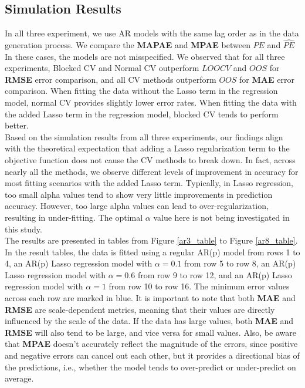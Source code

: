 \documentclass[12pt, oneside]{amsart}
\theoremstyle{definition}
\theoremstyle{remark}
\numberwithin{equation}{section}
\begin{document}
\subsection{Simulation Results}
In all three experiment, we use AR models with the same lag order as in the data generation process. We compare the \textbf{MAPAE} and \textbf{MPAE} between $PE$ and $\hat{PE}$ In these cases, the models are not misspecified. We observed that for all three experiments, Blocked CV and Normal CV outperform $LOOCV$ and $OOS$ for \textbf{RMSE} error comparison, and all CV methods outperform $OOS$ for \textbf{MAE} error comparison. When fitting the data without the Lasso term in the regression model, normal CV provides slightly lower error rates. When fitting the data with the added Lasso term in the regression model, blocked CV tends to perform better. \\

Based on the simulation results from all three experiments, our findings align with the theoretical expectation that adding a Lasso regularization term to the objective function does not cause the CV methods to break down. In fact, across nearly all the methods, we observe different levels of improvement in accuracy for most fitting scenarios with the added Lasso term. Typically, in Lasso regression, too small alpha values tend to show very little improvements in prediction accuracy. However, too large alpha values can lead to over-regularization, resulting in under-fitting. The optimal $\alpha$ value here is not being investigated in this study.\\

The results are presented in tables from Figure \ref{ar3_table} to Figure \ref{ar8_table}. In the result tables, the data is fitted using a regular AR(p) model from rows 1 to 4, an AR(p) Lasso regression model with $\alpha = 0.1$ from row 5 to row 8, an AR(p) Lasso regression model with $\alpha = 0.6$ from row 9 to row 12, and an AR(p) Lasso regression model with $\alpha = 1$ from row 10 to row 16. The minimum error values across  each row are marked in blue. It is important to note that both \textbf{MAE} and \textbf{RMSE} are scale-dependent metrics, meaning that their values are directly influenced by the scale of the data. If the data has large values, both \textbf{MAE} and \textbf{RMSE} will also tend to be large, and vice versa for small values. Also, be aware that \textbf{MPAE} doesn't accurately reflect the magnitude of the errors, since positive and negative errors can cancel out each other, but it provides a directional bias of the predictions, i.e., whether the model tends to over-predict or under-predict on average. 
\end{document}
